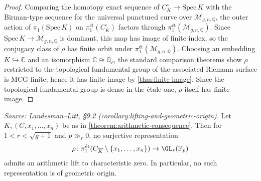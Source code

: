 \begin{proof}
  Comparing the homotopy exact sequence of $C^\circ_{\overline{K}} \to
  \mathrm{Spec}\,K$ with the Birman-type sequence for the universal punctured
  curve over $\mathcal{M}_{g,n,\mathbb{Q}}$, the outer action of
  $\pi_1(\mathrm{Spec}\,K)$ on $\pi_1^{\text{\'et}}(C^\circ_{\overline{K}})$
  factors through $\pi_1^{\text{\'et}}(\mathcal{M}_{g,n,\mathbb{Q}})$.
  Since $\mathrm{Spec}\,K \to \mathcal{M}_{g,n,\mathbb{Q}}$ is dominant, this map
  has image of finite index, so the conjugacy class of $\rho$ has finite orbit
  under $\pi_1^{\text{\'et}}(\mathcal{M}_{g,n,\overline{\mathbb{Q}}})$.
  Choosing an embedding $\overline{K} \hookrightarrow \mathbb{C}$ and an
  isomorphism $\mathbb{C} \cong \overline{\mathbb{Q}}_\ell$, the standard
  comparison theorems show $\rho$ restricted to the topological fundamental
  group of the associated Riemann surface is MCG-finite; hence it has finite
  image by \cref{thm:finite-image}.
  Since the topological fundamental group is dense in the \'etale one, $\rho$
  itself has finite image.
\end{proof}

\begin{corollary}
  \label{corollary:lifting-and-geometric-origin}
  \textit{Source: Landesman--Litt, §9.2 (corollary:lifting-and-geometric-origin).}
  Let $K, (C, x_1, \ldots, x_n)$ be as in
  \cref{theorem:arithmetic-consequence}.
  Then for $1 < r < \sqrt{g+1}$ and $p \gg_r 0$, no surjective representation
  \[
    \rho\colon \pi_1^{\text{\'et}}(C_{\overline{K}} \setminus \{x_1, \ldots, x_n\})
    \to \GL_r(\mathbb{F}_p)
  \]
  admits an arithmetic lift to characteristic zero.
  In particular, no such representation is of geometric origin.
\end{corollary}

